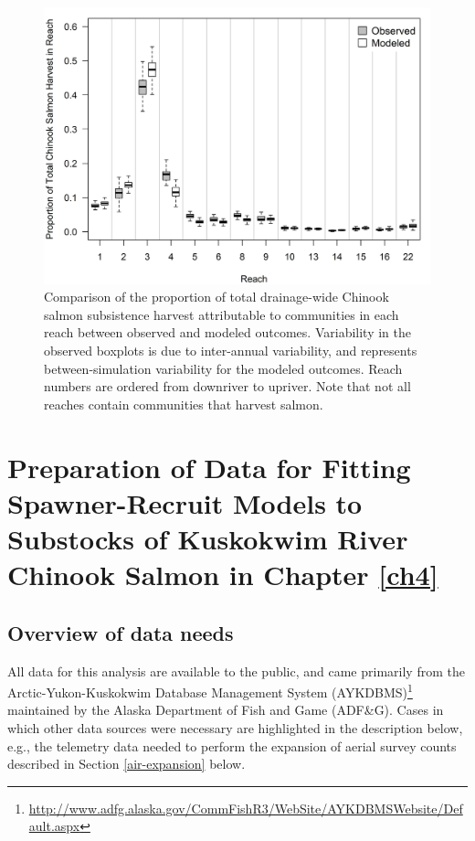 \documentclass[12pt,]{book}
\let\rmarkdownfootnote\footnote%
\def\footnote{\protect\rmarkdownfootnote}
\theoremstyle{definition}
\theoremstyle{definition}
\theoremstyle{definition}
\theoremstyle{remark}
\begin{document}
\clearpage

\begin{figure}
  \centering
  \includegraphics{img/Ch3/Figure B4.jpg}
  \caption{Comparison of the proportion of total drainage-wide Chinook salmon subsistence harvest attributable to communities in each reach between observed and modeled outcomes. Variability in the observed boxplots is due to inter-annual variability, and represents between-simulation variability for the modeled outcomes. Reach numbers are ordered from downriver to upriver. Note that not all reaches contain communities that harvest salmon.}
  \label{fig:spatial-harvest}
\end{figure}

\chapter{Preparation of Data for Fitting Spawner-Recruit Models to
Substocks of Kuskokwim River Chinook Salmon in Chapter
\ref{ch4}}\label{appendix-c}

\section{Overview of data needs}\label{overview-of-data-needs}

\noindent
All data for this analysis are available to the public, and came
primarily from the Arctic-Yukon-Kuskokwim Database Management System
(AYKDBMS)\footnote{\url{http://www.adfg.alaska.gov/CommFishR3/WebSite/AYKDBMSWebsite/Default.aspx}}
maintained by the Alaska Department of Fish and Game (ADF\&G). Cases in
which other data sources were necessary are highlighted in the
description below, e.g., the telemetry data needed to perform the
expansion of aerial survey counts described in Section
\ref{air-expansion} below.
\end{document}
